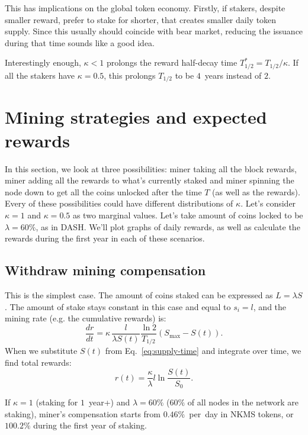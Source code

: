 \documentclass[longbibliography,nofootinbib,twocolumn]{revtex4-1}
\begin{document}
This has implications on the global token economy.
Firstly, if stakers, despite smaller reward, prefer to stake for shorter, that creates smaller daily token supply.
Since this usually should coincide with bear market, reducing the issuance during that time sounds like a good idea.

Interestingly enough, $\kappa < 1$ prolongs the reward half-decay time $T_{1/2}^* = T_{1/2} / \kappa$.
If all the stakers have $\kappa = 0.5$, this prolongs $T_{1/2}$ to be $4$~years instead of $2$.

\section{Mining strategies and expected rewards}

In this section, we look at three possibilities: miner taking all the block rewards, miner adding all the rewards to what's currently staked and miner spinning
the node down to get all the coins unlocked after the time $T$ (as well as the rewards).
Every of these possibilities could have different distributions of $\kappa$.
Let's consider $\kappa=1$ and $\kappa=0.5$ as two marginal values.
Let's take amount of coins locked to be $\lambda=60\%$, as in DASH.
We'll plot graphs of daily rewards, as well as calculate the rewards during the first year in each of these scenarios.

\subsection{Withdraw mining compensation}

This is the simplest case.
The amount of coins staked can be expressed as $L=\lambda S$.
The amount of stake stays constant in this case and equal to $s_i = l$, and the mining rate (e.g. the cumulative rewards) is:
\begin{equation}
    \frac{dr}{dt} =  \kappa\, \frac{l}{\lambda S(t)} \frac{\ln{2}}{T_{1/2}} \left( S_{\max} - S(t)\right).
\end{equation}
When we substitute $S(t)$ from Eq.~\ref{eq:supply-time} and integrate over time, we find total rewards:
\begin{equation}
    r(t) = \frac{\kappa}{\lambda} l \ln\frac{S(t)}{S_0}.
\end{equation}

If $\kappa=1$ (staking for $1$~year+) and $\lambda=60\%$ ($60\%$ of all nodes in the network are staking),
miner's compensation starts from $0.46\%$~per~day in NKMS tokens,
or $100.2\%$ during the first year of staking.
\end{document}
